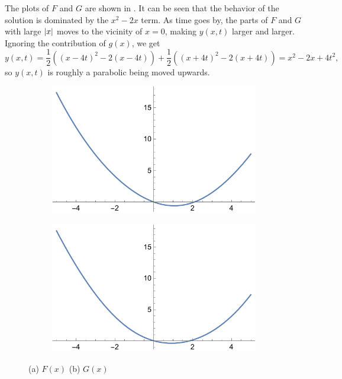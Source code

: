 \documentclass[hyperref, a4paper]{article}
\begin{document}
The plots of $F$ and $G$ are shown in .
It can be seen that the behavior of the solution is dominated by the $x^2 - 2x$ term.
As time goes by, 
the parts of $F$ and $G$ with large $\abs{x}$ moves to the vicinity of $x = 0$,
making $y(x, t)$ larger and larger.
Ignoring the contribution of $g(x)$, we get 
\begin{equation}
    y(x, t) = \frac{1}{2} ((x - 4t)^2 - 2 (x - 4t)) + \frac{1}{2} ((x + 4t)^2 - 2 (x + 4t))
    = x^2 - 2 x + 4 t^2,
\end{equation}
so $y(x, t)$ is roughly a parabolic being moved upwards.

\begin{figure}
    \centering
    \begin{subfigure}{0.45\textwidth}
        \includegraphics[width=\textwidth]{plots/wave-f-1.pdf}
        \subcaption{}
    \end{subfigure}
    \begin{subfigure}{0.45\textwidth}
        \includegraphics[width=\textwidth]{plots/wave-g-1.pdf}
        \subcaption{}
    \end{subfigure}
    \caption{(a) $F(x)$ (b) $G(x)$}
    \label{fig:plot-1} 
\end{figure}

\section{}
\end{document}
